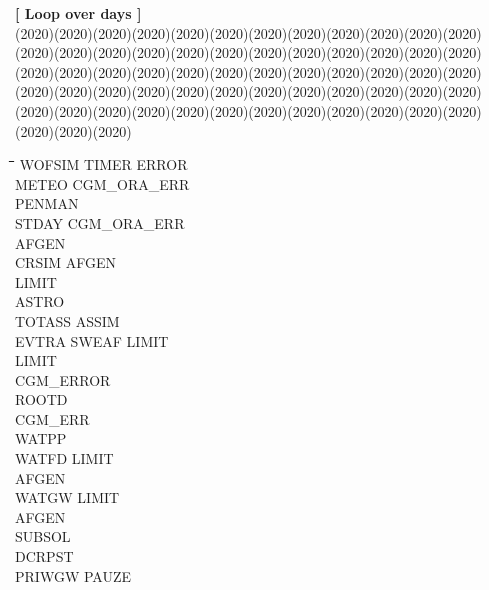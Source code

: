 \strut\hfill {\bf [ Loop over days ]}\\
 \GrBox(2020)\GrBox(2020)\GrBox(2020)\GrBox(2020)\GrBox(2020)\GrBox(2020)\GrBox(2020)\GrBox(2020)\GrBox(2020)\GrBox(2020)\GrBox(2020)\GrBox(2020)\GrBox(2020)\GrBox(2020)\GrBox(2020)\GrBox(2020)\GrBox(2020)\GrBox(2020)\GrBox(2020)\GrBox(2020)\GrBox(2020)\GrBox(2020)\GrBox(2020)\GrBox(2020)\GrBox(2020)\GrBox(2020)\GrBox(2020)\GrBox(2020)\GrBox(2020)\GrBox(2020)\GrBox(2020)\GrBox(2020)\GrBox(2020)\GrBox(2020)\GrBox(2020)\GrBox(2020)\GrBox(2020)\GrBox(2020)\GrBox(2020)\GrBox(2020)\GrBox(2020)\GrBox(2020)\GrBox(2020)\GrBox(2020)\GrBox(2020)\GrBox(2020)\GrBox(2020)\GrBox(2020)\GrBox(2020)\GrBox(2020)\GrBox(2020)\GrBox(2020)\GrBox(2020)\GrBox(2020)\GrBox(2020)\GrBox(2020)\GrBox(2020)\GrBox(2020)\GrBox(2020)\GrBox(2020)\GrBox(2020)\GrBox(2020)\GrBox(2020)\nwln
\begin{tabbing}
\hspace{1.27cm}\=\hspace{1.27cm}\=\hspace{1.27cm}\=\hspace{1.27cm}\=%
\hspace{1.27cm}\=\hspace{1.27cm}\=\hspace{1.27cm}\=\hspace{1.27cm}\=%
\hspace{1.27cm}\=\hspace{1.27cm}\=\kill
\>\> \> WOFSIM\> \> TIMER\> \> ERROR\\
\>\> \> \> \> METEO\> \> CGM\_ORA\_ERR\\
\>\> \> \> \> \> \> PENMAN\\
\>\> \> \> \> STDAY\> \> CGM\_ORA\_ERR\\
\>\> \> \> \> \> \> AFGEN\\
\>\> \> \> \> CRSIM\> \> AFGEN\\
\>\> \> \> \> \> \> LIMIT\\
\>\> \> \> \> \> \> ASTRO\\
\>\> \> \> \> \> \> TOTASS\> \> ASSIM\\
\>\> \> \> \> \> \> EVTRA\> \> SWEAF\> LIMIT\\
\>\> \> \> \> \> \> \> \> LIMIT\\
\>\> \> \> \> \> \> CGM\_ERROR\\
\>\> \> \> \> ROOTD\\
\>\> \> \> \> CGM\_ERR\\
\>\> \> \> \> WATPP\\
\>\> \> \> \> WATFD\> \> LIMIT\\
\>\> \> \> \> \> \> AFGEN\\
\>\> \> \> \> WATGW\> \> LIMIT\\
\>\> \> \> \> \> \> AFGEN\\
\>\> \> \> \> \> \> SUBSOL\\
\>\> \> \> \> DCRPST\\
\>\> \> \> \> PRIWGW\> \> PAUZE
\end{tabbing}
